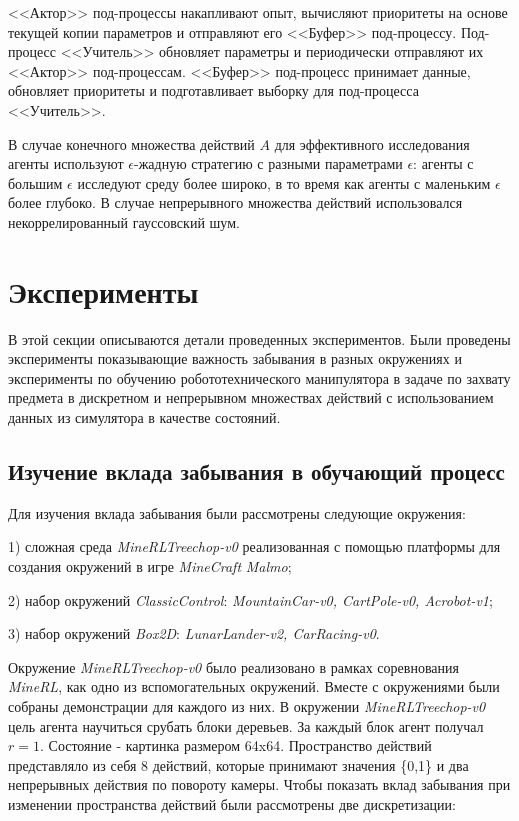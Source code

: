 \documentclass{mipt-thesis-bs}
\begin{document}
<<Актор>> под-процессы накапливают опыт, вычисляют приоритеты на основе текущей копии параметров и отправляют его <<Буфер>> под-процессу. Под-процесс <<Учитель>> обновляет параметры и периодически отправляют их <<Актор>> под-процессам. <<Буфер>> под-процесс принимает данные, обновляет приоритеты и подготавливает выборку для под-процесса <<Учитель>>.

В случае конечного множества действий $A$ для эффективного исследования агенты используют $\epsilon$-жадную стратегию с разными параметрами $\epsilon$: агенты с большим $\epsilon$ исследуют среду более широко, в то время как агенты с маленьким $\epsilon$ более глубоко.
В случае непрерывного множества действий использовался некоррелированный гауссовский шум.

 
\chapter{Эксперименты}

В этой секции описываются детали проведенных экспериментов. Были проведены эксперименты показывающие важность забывания в разных окружениях и эксперименты по обучению робототехнического манипулятора в задаче по захвату предмета в дискретном и непрерывном множествах действий с использованием данных из симулятора в качестве состояний. 


\section{Изучение вклада забывания в обучающий процесс}

Для изучения вклада забывания были рассмотрены следующие окружения:

1) сложная среда \textit{MineRLTreechop-v0} реализованная с помощью платформы для создания окружений в игре \textit{MineCraft} \textit{Malmo};

2) набор окружений \textit{ClassicControl}: \textit{MountainCar-v0, CartPole-v0, Acrobot-v1};

3) набор окружений \textit{Box2D}: \textit{LunarLander-v2, CarRacing-v0}.

Окружение \textit{MineRLTreechop-v0} было реализовано в рамках соревнования \textit{MineRL}, как одно из вспомогательных окружений. Вместе с окружениями были собраны демонстрации для каждого из них. В окружении \textit{MineRLTreechop-v0} цель агента научиться срубать блоки деревьев. За каждый блок агент получал $r=1$. Состояние - картинка размером 64x64. Пространство действий представляло из себя 8 действий, которые принимают значения \{0,1\} и два непрерывных действия по повороту камеры. Чтобы показать вклад забывания при изменении пространства действий были рассмотрены две дискретизации: 
\end{document}
